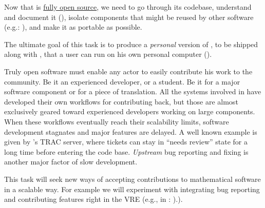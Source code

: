 \begin{workpackage}[id=component-architecture,wphases=0-48!.5,
  title=Component Architecture,lead=UV,
  PSRM=64,UVRM=8,SARM=16, USHRM=4, USORM=6, UORM=4, LLRM=22]
\begin{tasklist}
\begin{task}[title=Document and modularize \SMC's codebase,id=extract-smc,lead=PS,PM=10,partners={UV},wphases=0-24]
    Now that \SMC is
    \href{https://twitter.com/sagemath/status/544939872294014977}{fully
      open source}, we need to go through its codebase, understand and
    document it
    (), isolate
    components that might be reused by other software (e.g.:
    \Jupyter), and make it as portable as possible.

    The ultimate goal of this task is to produce a \emph{personal}
    version of \SMC, to be shipped along with \Sage, that a user can
    run on his own personal computer
    ().
  \end{task}

  \begin{task}[title=Improving the development workflow in mathematical software,id=workflow,lead=UV,PM=10,partners={PS,LL},wphases=6-24]
    Truly open software must enable any actor to easily contribute his
    work to the community. Be it an experienced developer, or a
    student. Be it for a major software component or for a piece of
    translation. All the systems involved in \TheProject have
    developed their own workflows for contributing back, but those are
    almost exclusively geared toward experienced developers working on
    large components. When these workflows eventually reach their
    scalability limits, software development stagnates and major
    features are delayed. A well known example is given by \Sage's TRAC
    server, where tickets can stay in ``needs review'' state for a
    long time before entering the code base.  \emph{Upstream} bug
    reporting and fixing is another major factor of slow development.

    This task will seek new ways of accepting contributions to
    mathematical software in a scalable way. For example we will
    experiment with integrating bug reporting and contributing
    features right in the VRE (e.g., in \SMC:
    ).).

  \end{task}



\end{tasklist}
\end{workpackage}
